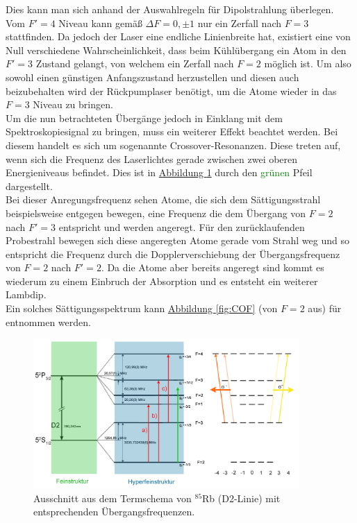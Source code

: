 \documentclass[
class=book,
accentcolor=1b,
custommargins=geometry,
fontsize=11pt,
thesis={type=Versuchsanleitung},
ruledheaders=all,
headline=false,
instbox=false,
marginpar=false,
title=small,
ignore-missing-data=true,
twoside=false,
logofile=apqdesign/tuda_logo.pdf,
pdfa=false %
]{apqpub}
\newcommand{\gqq}[1]{\glqq{}#1\grqq{}}
\begin{document}
					Dies kann man sich anhand der Auswahlregeln für Dipolstrahlung überlegen. 
					Vom $F'=4$ Niveau kann gemäß $\Delta F=0,\pm 1$ nur ein Zerfall nach $F=3$ stattfinden. Da jedoch der Laser eine endliche Linienbreite hat, existiert eine von Null verschiedene Wahrscheinlichkeit, dass beim Kühlübergang ein Atom in den $F'=3$ Zustand gelangt, von welchem ein Zerfall nach $F=2$ möglich ist. 
					Um also sowohl einen günstigen Anfangszustand herzustellen und diesen auch beizubehalten wird der Rückpumplaser benötigt, um die Atome wieder in das $F=3$ Niveau zu bringen.\\
					Um die nun betrachteten Übergänge jedoch in Einklang mit dem Spektroskopiesignal zu bringen, muss ein weiterer Effekt beachtet werden. 
					Bei diesem handelt es sich um sogenannte Crossover-Resonanzen. Diese treten auf, wenn sich die Frequenz des Laserlichtes gerade zwischen zwei oberen Energieniveaus befindet. 
					Dies ist in \hyperref[fig:TS]{Abbildung \ref{fig:TS}} durch den \textcolor{green}{grünen} Pfeil dargestellt.\\
					Bei dieser Anregungsfrequenz \gqq{sehen} Atome, die sich dem Sättigungsstrahl beispielsweise entgegen bewegen, eine Frequenz die dem Übergang  von $F=2$ nach $F'=3$ entspricht und werden angeregt. 
					Für den zurücklaufenden Probestrahl bewegen sich diese angeregten Atome gerade vom Strahl weg und so entspricht die Frequenz durch die Dopplerverschiebung der Übergangsfrequenz von $F=2$ nach $F'=2$. 
					Da die Atome aber bereits angeregt sind kommt es wiederum zu einem Einbruch der Absorption und es entsteht ein weiterer Lambdip.\\
					Ein solches Sättigungsspektrum kann \hyperref[fig:COF]{Abbildung \ref{fig:COF}} (von $F=2$ aus) für  entnommen werden.\\ 									
					\begin{figure}[htb!]
						\centering
						\includegraphics[width = 0.9\textwidth]{graphics/TS_korrigiert.jpg}
						\caption{Ausschnitt aus dem Termschema von $^{85}$Rb (D2-Linie) mit entsprechenden Übergangsfrequenzen.}
						\label{fig:TS}
					\end{figure}
\end{document}
